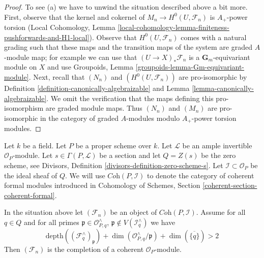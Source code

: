 \begin{proof}
\medskip\noindent
To see (a) we have to unwind the situation described above a bit more.
First, observe that the kernel and cokernel of $M_n \to H^0(U, \mathcal{F}_n)$
is $A_+$-power torsion (Local Cohomology, Lemma
\ref{local-cohomology-lemma-finiteness-pushforwards-and-H1-local}).
Observe that $H^0(U, \mathcal{F}_n)$ comes with a natural grading
such that these maps and the transition maps of the system are
graded $A$-module map; for example we can use that
$(U \to X)_*\mathcal{F}_n$ is a $\mathbf{G}_m$-equivariant module
on $X$ and use 
Groupoids, Lemma \ref{groupoids-lemma-Gm-equivariant-module}.
Next, recall that $(N_n)$ and $(H^0(U, \mathcal{F}_n))$
are pro-isomorphic by Definition \ref{definition-canonically-algebraizable}
and Lemma \ref{lemma-canonically-algebraizable}.
We omit the verification that the maps defining this
pro-isomorphism are graded module maps.
Thus $(N_n)$ and $(M_n)$ are pro-isomorphic in the category of
graded $A$-modules modulo $A_+$-power torsion modules.
\end{proof}

\noindent
Let $k$ be a field. Let $P$ be a proper scheme over $k$.
Let $\mathcal{L}$ be an ample invertible $\mathcal{O}_P$-module.
Let $s \in \Gamma(P, \mathcal{L})$ be a section and let
$Q = Z(s)$ be the zero scheme, see
Divisors, Definition \ref{divisors-definition-zero-scheme-s}.
Let $\mathcal{I} \subset \mathcal{O}_P$ be the ideal sheaf of $Q$.
We will use $\textit{Coh}(P, \mathcal{I})$ to denote the category
of coherent formal modules introduced in
Cohomology of Schemes, Section \ref{coherent-section-coherent-formal}.

\begin{proposition}
\label{proposition-lefschetz-existence}
In the situation above let $(\mathcal{F}_n)$ be an object of
$\textit{Coh}(P, \mathcal{I})$. Assume for all $q \in Q$ and for
all primes $\mathfrak p \in \mathcal{O}_{P, q}^\wedge$,
$\mathfrak p \not \in V(\mathcal{I}_q^\wedge)$ we have
$$
\text{depth}((\mathcal{F}_q^\wedge)_\mathfrak p) +
\dim(\mathcal{O}_{P, q}^\wedge/\mathfrak p) +
\dim(\overline{\{q\}}) > 2
$$
Then $(\mathcal{F}_n)$ is the completion of a coherent
$\mathcal{O}_P$-module.
\end{proposition}

